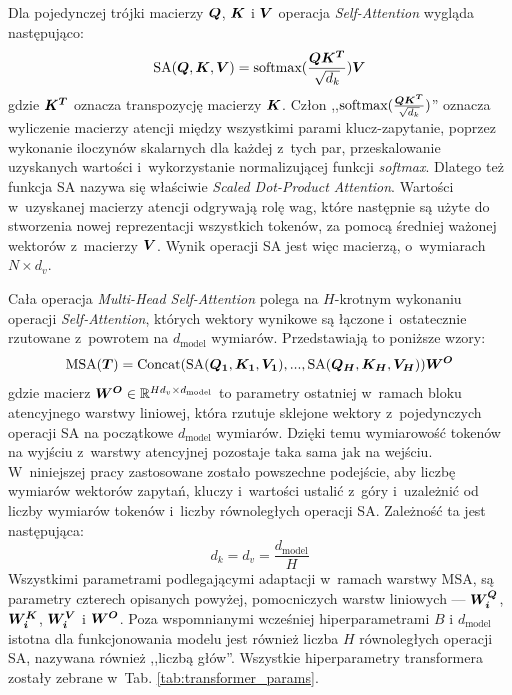 Dla pojedynczej trójki macierzy $\boldsymbol{Q}$, $\boldsymbol{K}$ i $\boldsymbol{V}$ operacja \emph{Self-Attention} wygląda następująco:
\begin{equation} \label{eq:sa}
    \textrm{SA}(\boldsymbol{Q}, \boldsymbol{K}, \boldsymbol{V}) = \textrm{softmax}(\frac{\boldsymbol{Q}\boldsymbol{K^T}}{\sqrt{d_k}})\boldsymbol{V}
\end{equation}
gdzie $\boldsymbol{K^T}$ oznacza transpozycję macierzy $\boldsymbol{K}$. Człon ,,$\textrm{softmax}(\frac{\boldsymbol{Q}\boldsymbol{K^T}}{\sqrt{d_k}})$'' oznacza wyliczenie macierzy atencji między wszystkimi parami klucz-zapytanie, poprzez wykonanie iloczynów skalarnych dla każdej z~tych par, przeskalowanie uzyskanych wartości i~wykorzystanie normalizującej funkcji \emph{softmax}. Dlatego też funkcja SA nazywa się właściwie \emph{Scaled Dot-Product Attention}.  Wartości w~uzyskanej macierzy atencji odgrywają rolę wag, które następnie są użyte do stworzenia nowej reprezentacji wszystkich tokenów, za pomocą średniej ważonej wektorów z~macierzy $\boldsymbol{V}$.  Wynik operacji SA jest więc macierzą, o~wymiarach $N \times d_v$.

Cała operacja \emph{Multi-Head Self-Attention} polega na $H$-krotnym wykonaniu operacji \emph{Self-Attention}, których wektory wynikowe są łączone i~ostatecznie rzutowane z~powrotem na $d_{\mathrm{model}}$ wymiarów. Przedstawiają to poniższe wzory:
\begin{equation}
    \textrm{MSA}(\boldsymbol{T}) = \textrm{Concat}(\textrm{SA}(\boldsymbol{Q_1}, \boldsymbol{K_1}, \boldsymbol{V_1}), ..., \textrm{SA}(\boldsymbol{Q_H},
    \boldsymbol{K_H}, \boldsymbol{V_H}))\boldsymbol{W^O}
\end{equation}
gdzie macierz $\boldsymbol{W^O} \in \mathbb{R}^{Hd_v \times d_{\mathrm{model}}}$ to parametry ostatniej w~ramach bloku atencyjnego warstwy liniowej, która rzutuje sklejone wektory z~pojedynczych operacji SA na początkowe $d_{\mathrm{model}}$ wymiarów. Dzięki temu wymiarowość tokenów na wyjściu z~warstwy atencyjnej pozostaje taka sama jak na wejściu. W~niniejszej pracy zastosowane zostało powszechne podejście, aby liczbę wymiarów wektorów zapytań, kluczy i~wartości ustalić z~góry i~uzależnić od liczby wymiarów tokenów i~liczby równoległych operacji SA. Zależność ta jest następująca:
\begin{equation}
    d_k = d_v = \frac{d_{\mathrm{model}}}{H}
\end{equation}
Wszystkimi parametrami podlegającymi adaptacji w~ramach warstwy MSA, są parametry czterech opisanych powyżej, pomocniczych warstw liniowych --- $\boldsymbol{W_i^Q}$, $\boldsymbol{W_i^K}$, $\boldsymbol{W_i^V}$ i $\boldsymbol{W^O}$. Poza wspomnianymi wcześniej hiperparametrami $B$ i $d_{\mathrm{model}}$ istotna dla funkcjonowania modelu jest również liczba $H$ równoległych operacji SA, nazywana również ,,liczbą głów''. Wszystkie hiperparametry transformera zostały zebrane w~Tab. \ref{tab:transformer_params}.

